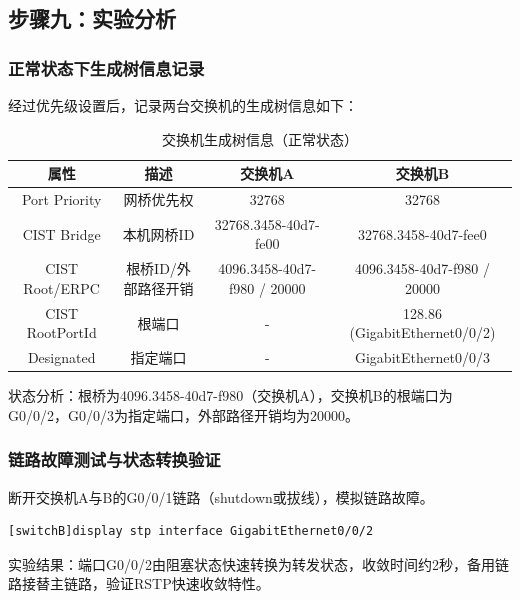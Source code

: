 \documentclass[a4paper]{article}
\begin{document}
\subsection{步骤九：实验分析}
\subsubsection{正常状态下生成树信息记录}
经过优先级设置后，记录两台交换机的生成树信息如下：
\begin{table}[H]
    \centering
    \begin{tabular}{|c|c|c|c|}
        \hline
        属性 & 描述 & 交换机A & 交换机B \\
        \hline
        Port Priority & 网桥优先权 & 32768 & 32768 \\
        CIST Bridge & 本机网桥ID & 32768.3458-40d7-fe00 & 32768.3458-40d7-fee0 \\
        CIST Root/ERPC & 根桥ID/外部路径开销 & 4096.3458-40d7-f980 / 20000 & 4096.3458-40d7-f980 / 20000 \\
        CIST RootPortId & 根端口 & - & 128.86 (GigabitEthernet0/0/2) \\
        Designated & 指定端口 & - & GigabitEthernet0/0/3 \\
        \hline
    \end{tabular}
    \caption{交换机生成树信息（正常状态）}
\end{table}
状态分析：根桥为4096.3458-40d7-f980（交换机A），交换机B的根端口为G0/0/2，G0/0/3为指定端口，外部路径开销均为20000。

\subsubsection{链路故障测试与状态转换验证}
断开交换机A与B的G0/0/1链路（shutdown或拔线），模拟链路故障。
\begin{lstlisting}[language=bash]
[switchB]display stp interface GigabitEthernet0/0/2
\end{lstlisting}
实验结果：端口G0/0/2由阻塞状态快速转换为转发状态，收敛时间约2秒，备用链路接替主链路，验证RSTP快速收敛特性。
\end{document}
